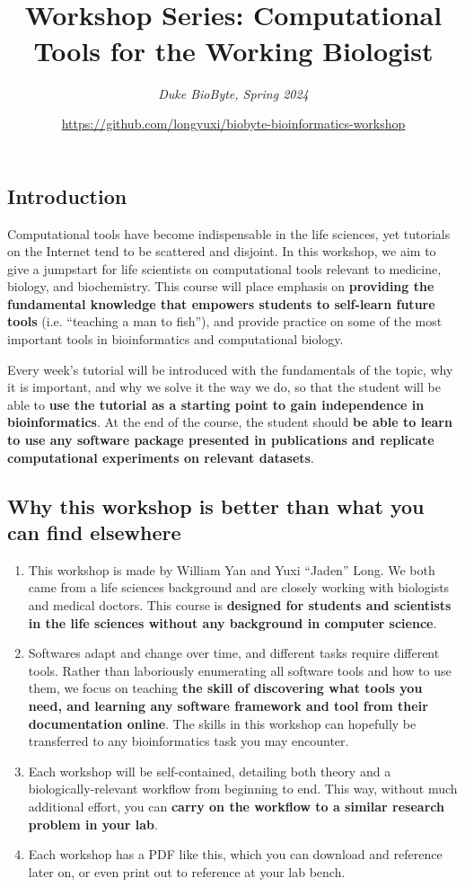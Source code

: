 \documentclass[12pt,letterpaper]{article}
\title{\textbf{\\Workshop Series: Computational Tools for the Working Biologist}}
\author{\textit{Duke BioByte, Spring 2024}}
\date{\url{https://github.com/longyuxi/biobyte-bioinformatics-workshop}}
\begin{document}
\maketitle

\thispagestyle{empty}

\subsection{Introduction}

Computational tools have become indispensable in the life sciences, yet tutorials on the Internet tend to be scattered and disjoint. In this workshop, we aim to give a jumpstart for life scientists on computational tools relevant to medicine, biology, and biochemistry. This course will place emphasis on \textbf{providing the fundamental knowledge that empowers students to self-learn future tools} (i.e. “teaching a man to fish”), and provide practice on some of the most important tools in bioinformatics and computational biology.

Every week's tutorial will be introduced with the fundamentals of the topic, why it is important, and why we solve it the way we do, so that the student will be able to \textbf{use the tutorial as a starting point to gain independence in bioinformatics}. At the end of the course, the student should \textbf{be able to learn to use any software package presented in publications and replicate computational experiments on relevant datasets}.


\subsection{Why this workshop is better than what you can find elsewhere}

\begin{enumerate}
   \item This workshop is made by William Yan and Yuxi ``Jaden'' Long. We both came from a life sciences background and are closely working with biologists and medical doctors. This course is \textbf{designed for students and scientists in the life sciences without any background in computer science}.
   \item Softwares adapt and change over time, and different tasks require different tools. Rather than laboriously enumerating all software tools and how to use them, we focus on teaching \textbf{the skill of discovering what tools you need, and learning any software framework and tool from their documentation online}. The skills in this workshop can hopefully be transferred to any bioinformatics task you may encounter.
   \item Each workshop will be self-contained, detailing both theory and a biologically-relevant workflow from beginning to end. This way, without much additional effort, you can \textbf{carry on the workflow to a similar research problem in your lab}.
   \item Each workshop has a PDF like this, which you can download and reference later on, or even print out to reference at your lab bench.
\end{enumerate}
\end{document}

